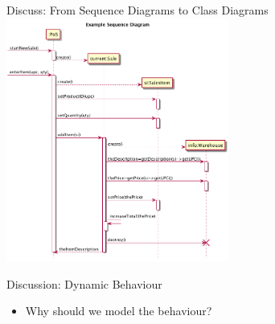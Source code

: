 \documentclass[10pt,t,a4paper]{beamer}
\begin{document}
\begin{frame}[label=sec-1-10]{Discuss: From Sequence Diagrams to Class Diagrams}
\vspace{-0.5cm}\hspace{2cm}
\includegraphics[height=8cm]{FSequenceDiagrams.png}
\end{frame}
\begin{frame}[label=sec-1-11]{Discussion: Dynamic Behaviour}
\begin{itemize}
\item Why should we model the behaviour?
\end{itemize}
\end{frame}
\end{document}
